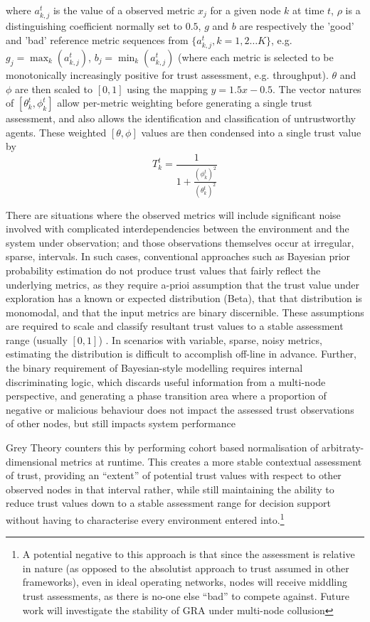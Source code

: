 \documentclass[runningheads,a4paper]{llncs}
\begin{document}
where $a_{k,j}^t$ is the value of a observed metric $x_j$ for a given node $k$ at time $t$, $\rho$ is a distinguishing coefficient normally set to $0.5$, $g$ and $b$ are respectively the 'good' and 'bad' reference metric sequences from $\{a_{k,j}^t, k=1,2\dots K\}$, e.g. $g_j=\max_k({a_{k,j}^t})$,  $b_j=\min_k({a_{k,j}^t})$ (where each metric is selected to be monotonically increasingly positive for trust assessment, e.g. throughput). $\theta$ and $\phi$ are then scaled to $[0,1]$ using the mapping $y = 1.5 x - 0.5$.
The vector natures of $[\theta_k^t,\phi_k^t]$ allow per-metric weighting before generating a single trust assessment, and also allows the identification and classification of untrustworthy agents.
These weighted $[\theta,\phi]$ values are then condensed into a single trust value by
\begin{equation}
  \label{eq:trustvalue}
  T_k^t = \frac{1}{1+\frac{(\phi_k^t)^2}{(\theta_k^t)^2}}
\end{equation}

There are situations where the observed metrics will include significant noise involved with complicated interdependencies between the environment and the system under observation; and those observations themselves occur at irregular, sparse, intervals.
In such cases, conventional approaches such as Bayesian prior probability estimation do not produce trust values that fairly reflect the underlying metrics, as they require a-prioi assumption that the trust value under exploration has a known or expected distribution (Beta), that that distribution is monomodal, and that the input metrics are binary discernible.
These assumptions are required to scale and classify resultant trust values to a stable assessment range (usually $[0,1]$) \cite{Liu2006}.
In scenarios with variable, sparse, noisy metrics, estimating the distribution is difficult to accomplish off-line in advance.
Further, the binary requirement of Bayesian-style modelling requires internal discriminating logic, which discards useful information from a multi-node perspective, and generating a phase transition area where a proportion of negative or malicious behaviour does not impact the assessed trust observations of other nodes, but still impacts system performance \cite{Mundinger2008}

Grey Theory counters this by performing cohort based normalisation of arbitraty-dimensional metrics at runtime. 
This creates a more stable contextual assessment of trust, providing an ``extent'' of potential trust values with respect to other observed nodes in that interval rather, while still maintaining the ability to reduce trust values down to a stable assessment range for decision support without having to characterise every environment entered into.\footnote{A potential negative to this approach is that since the assessment is relative in nature (as opposed to the absolutist approach to trust assumed in other frameworks), even in ideal operating networks, nodes will receive middling trust assessments, as there is no-one else ``bad'' to compete against. Future work will investigate the stability of GRA under multi-node collusion}
\end{document}

